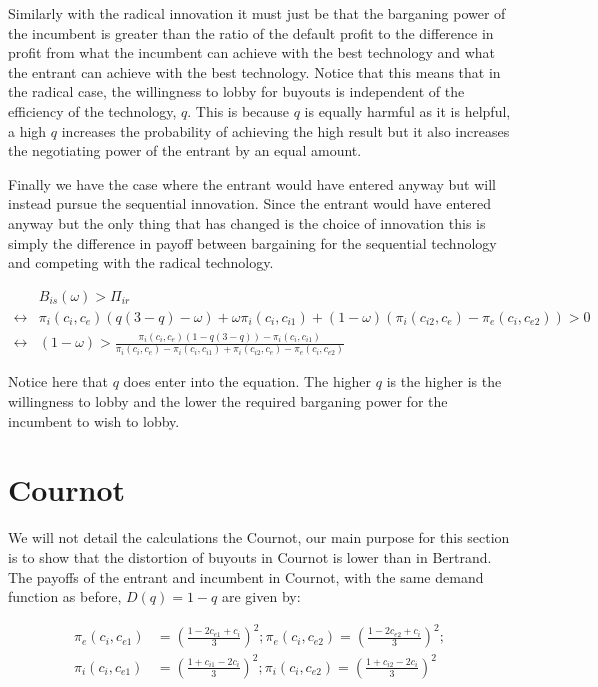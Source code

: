 \documentclass[11pt]{article}
\begin{document}
Similarly with the radical innovation it must just be that the barganing power of the incumbent is greater than the ratio of the default profit to the difference in profit from what the incumbent can achieve with the best technology and what the entrant can achieve with the best technology. Notice that this means that in the radical case, the willingness to lobby for buyouts is independent of the efficiency of the technology, $q$. This is because $q$ is equally harmful as it is helpful, a high $q$ increases the probability of achieving the high result but it also increases the negotiating power of the entrant by an equal amount. 

Finally we have the case where the entrant would have entered anyway but will instead pursue the sequential innovation. Since the entrant would have entered anyway but the only thing that has changed is the choice of innovation this is simply the difference in payoff between bargaining for the sequential technology and competing with the radical technology. 

\begin{align*}
&B_{is}(\omega)>\Pi_{ir} \\
\leftrightarrow &\pi_i(c_i,c_e)(q(3-q) -\omega) 
+\omega \pi_i(c_i,c_{i1}) 
 +(1-\omega)(\pi_i(c_{i2},c_e)-\pi_e(c_{i},c_{e2})) 
> 0 \\
\leftrightarrow &
(1-\omega)> \frac{\pi_i(c_i,c_e)(1-q(3-q))-\pi_i(c_i,c_{i1})}{\pi_i(c_i,c_e)-\pi_i(c_i,c_{i1})+\pi_i(c_{i2},c_e)-\pi_e(c_{i},c_{e2})}  
\end{align*}

Notice here that $q$ does enter into the equation. The higher $q$ is the higher is the willingness to lobby and the lower the required barganing power for the incumbent to wish to lobby. 

\section*{Cournot}

We will not detail the calculations the Cournot, our main purpose for this section is to show that the distortion of buyouts in Cournot is lower than in Bertrand. The payoffs of the entrant and incumbent in Cournot, with the same demand function as before, $D(q)=1-q$ are given by:

\begin{align*}
\pi_{e}(c_i,c_{e1}) &= \left(\frac{1-2 c_{e1}+c_{i}}{3}  \right)^2;
\pi_{e}(c_i,c_{e2}) = \left(\frac{1-2 c_{e2}+c_{i}}{3}  \right)^2; \\
\pi_{i}(c_i,c_{e1}) &= \left(\frac{1+ c_{i1}-2c_{i}}{3}  \right)^2;
\pi_{i}(c_i,c_{e2}) = \left(\frac{1+ c_{i2}-2c_{i}}{3}  \right)^2 \\
\end{align*}
\end{document}
